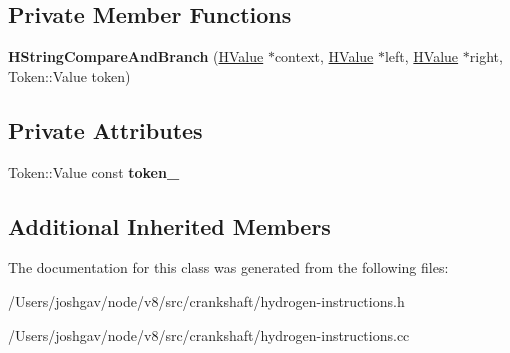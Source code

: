 \subsection*{Private Member Functions}
\begin{DoxyCompactItemize}
\item 
{\bfseries H\+String\+Compare\+And\+Branch} (\hyperlink{classv8_1_1internal_1_1_h_value}{H\+Value} $\ast$context, \hyperlink{classv8_1_1internal_1_1_h_value}{H\+Value} $\ast$left, \hyperlink{classv8_1_1internal_1_1_h_value}{H\+Value} $\ast$right, Token\+::\+Value token)\hypertarget{classv8_1_1internal_1_1_h_string_compare_and_branch_a3d104737da0595c42ecd339070270d37}{}\label{classv8_1_1internal_1_1_h_string_compare_and_branch_a3d104737da0595c42ecd339070270d37}

\end{DoxyCompactItemize}
\subsection*{Private Attributes}
\begin{DoxyCompactItemize}
\item 
Token\+::\+Value const {\bfseries token\+\_\+}\hypertarget{classv8_1_1internal_1_1_h_string_compare_and_branch_a2558868f2ae65b10f1b996eeda5a006a}{}\label{classv8_1_1internal_1_1_h_string_compare_and_branch_a2558868f2ae65b10f1b996eeda5a006a}

\end{DoxyCompactItemize}
\subsection*{Additional Inherited Members}


The documentation for this class was generated from the following files\+:\begin{DoxyCompactItemize}
\item 
/\+Users/joshgav/node/v8/src/crankshaft/hydrogen-\/instructions.\+h\item 
/\+Users/joshgav/node/v8/src/crankshaft/hydrogen-\/instructions.\+cc\end{DoxyCompactItemize}

